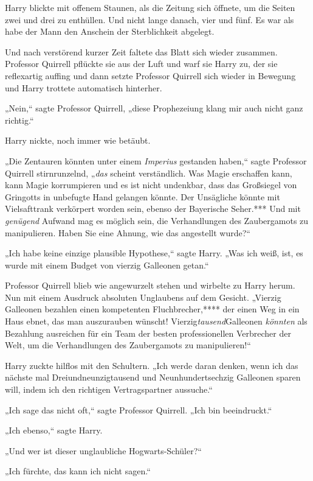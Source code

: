 {Harry blickte mit offenem Staunen, als die Zeitung sich öffnete, um die Seiten zwei und drei zu enthüllen. Und nicht lange danach, vier und fünf. Es war als habe der Mann den Anschein der Sterblichkeit abgelegt.

Und nach verstörend kurzer Zeit faltete das Blatt sich wieder zusammen. Professor Quirrell pflückte sie aus der Luft und warf sie Harry zu, der sie reflexartig auffing und dann setzte Professor Quirrell sich wieder in Bewegung und Harry trottete automatisch hinterher.

„Nein,“ sagte Professor Quirrell, „diese Prophezeiung klang mir auch nicht ganz richtig.“

Harry nickte, noch immer wie betäubt.

„Die Zentauren könnten unter einem \emph{Imperius} gestanden haben,“ sagte Professor Quirrell stirnrunzelnd, „\emph{das} scheint verständlich. Was Magie erschaffen kann, kann Magie korrumpieren und es ist nicht undenkbar, dass das Großsiegel von Gringotts in unbefugte Hand gelangen könnte. Der Unsägliche könnte mit Vielsafttrank verkörpert worden sein, ebenso der Bayerische Seher.*** Und mit \emph{genügend} Aufwand mag es möglich sein, die Verhandlungen des Zaubergamots zu manipulieren. Haben Sie eine Ahnung, wie das angestellt wurde?“

„Ich habe keine einzige plausible Hypothese,“ sagte Harry. „Was ich weiß, ist, es wurde mit einem Budget von vierzig Galleonen getan.“

Professor Quirrell blieb wie angewurzelt stehen und wirbelte zu Harry herum. Nun mit einem Ausdruck absoluten Unglaubens auf dem Gesicht. „Vierzig Galleonen bezahlen einen kompetenten Fluchbrecher,**** der einen Weg in ein Haus ebnet, das man auszurauben wünscht! Vierzig\emph{tausend}Galleonen \emph{könnten} als Bezahlung ausreichen für ein Team der besten professionellen Verbrecher der Welt, um die Verhandlungen des Zaubergamots zu manipulieren!“

Harry zuckte hilflos mit den Schultern. „Ich werde daran denken, wenn ich das nächste mal Dreiundneunzigtausend und Neunhundertsechzig Galleonen sparen will, indem ich den richtigen Vertragspartner aussuche.“

„Ich sage das nicht oft,“ sagte Professor Quirrell. „Ich bin beeindruckt.“

„Ich ebenso,“ sagte Harry.

„Und wer ist dieser unglaubliche Hogwarts-Schüler?“

„Ich fürchte, das kann ich nicht sagen.“

}
